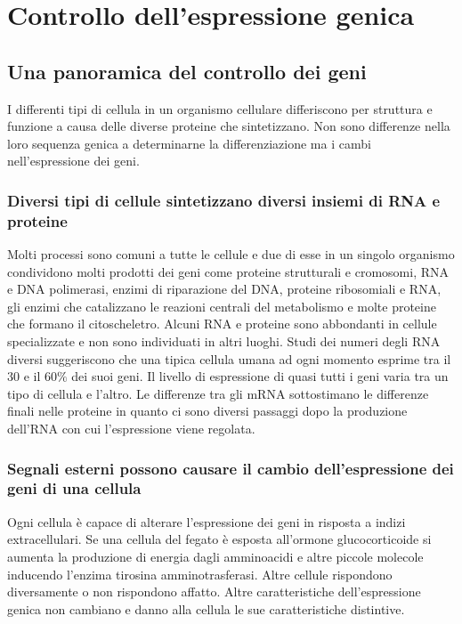 \chapter{Controllo dell'espressione genica}
\section{Una panoramica del controllo dei geni}
I differenti tipi di cellula in un organismo cellulare differiscono per struttura e funzione a causa delle diverse proteine che sintetizzano. Non sono differenze nella loro sequenza
genica a determinarne la differenziazione ma i cambi nell'espressione dei geni.
\subsection{Diversi tipi di cellule sintetizzano diversi insiemi di RNA e proteine}
Molti processi sono comuni a tutte le cellule e due di esse in un singolo organismo condividono molti prodotti dei geni come proteine strutturali e cromosomi, RNA e DNA polimerasi, enzimi
di riparazione del DNA, proteine ribosomiali e RNA, gli enzimi che catalizzano le reazioni centrali del metabolismo e molte proteine che formano il citoscheletro. Alcuni RNA e proteine
sono abbondanti in cellule specializzate e non sono individuati in altri luoghi. Studi dei numeri degli RNA diversi suggeriscono che una tipica cellula umana ad ogni momento esprime
tra il $30$ e il $60\%$ dei suoi geni. Il livello di espressione di quasi tutti i geni varia tra un tipo di cellula e l'altro. Le differenze tra gli mRNA sottostimano le differenze 
finali nelle proteine in quanto ci sono diversi passaggi dopo la produzione dell'RNA con cui l'espressione viene regolata. 
\subsection{Segnali esterni possono causare il cambio dell'espressione dei geni di una cellula}
Ogni cellula \`e capace di alterare l'espressione dei geni in risposta a indizi extracellulari. Se una cellula del fegato \`e esposta all'ormone glucocorticoide si aumenta la produzione
di energia dagli amminoacidi e altre piccole molecole inducendo l'enzima tirosina amminotrasferasi. Altre cellule rispondono diversamente o non rispondono affatto. Altre caratteristiche
dell'espressione genica non cambiano e danno alla cellula le sue caratteristiche distintive.

